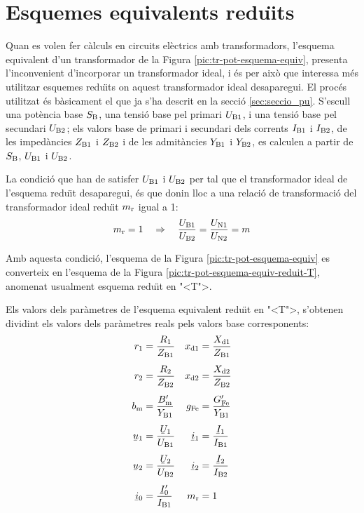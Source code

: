 \section{Esquemes equivalents redu\"{\i}ts}

Quan es volen fer c\`{a}lculs en circuits el\`{e}ctrics amb transformadors, l'esquema equivalent d'un transformador de la Figura  \vref{pic:tr-pot-esquema-equiv}, presenta l'inconvenient d'incorporar un transformador ideal, i \'{e}s per aix\`{o} que interessa m\'{e}s utilitzar esquemes redu\"{\i}ts on aquest transformador ideal desaparegui.
El proc\'{e}s utilitzat \'{e}s b\`{a}sicament el que ja s'ha descrit en la secci\'{o} \vref{sec:seccio_pu}. S'escull una pot\`{e}ncia base $S_\mathrm{B}$, una tensi\'{o} base pel primari $U_\mathrm{B1}$, i una tensi\'{o} base pel secundari $U_\mathrm{B2}$; els valors base de primari i secundari dels corrents $I_\mathrm{B1}$ i $I_\mathrm{B2}$, de les imped\`{a}ncies $Z_\mathrm{B1}$ i $Z_\mathrm{B2}$ i de les admit\`{a}ncies $Y_\mathrm{B1}$ i $Y_\mathrm{B2}$, es calculen a partir de $S_\mathrm{B}$, $U_\mathrm{B1}$ i $U_\mathrm{B2}$.

La condici\'{o} que han de satisfer $U_\mathrm{B1}$ i $U_\mathrm{B2}$ per tal que el transformador ideal de l'esquema redu\"{\i}t desaparegui, \'{e}s que donin lloc a una relaci\'{o} de transformaci\'{o} del transformador ideal redu\"{\i}t $m_\mathrm{r}$ igual a  1:
\begin{equation}\label{eq:mr}
    m_\mathrm{r} = 1 \quad \Rightarrow \quad \frac{U_\mathrm{B1}}{U_\mathrm{B2}} = \frac{U_\mathrm{N1}}{U_\mathrm{N2}} = m
\end{equation}

 Amb aquesta condici\'{o}, l'esquema de la Figura \vref{pic:tr-pot-esquema-equiv} es converteix en l'esquema de la Figura
\vref{pic:tr-pot-esquema-equiv-reduit-T}, anomenat usualment esquema redu\"{\i}t en {"<}T{">}.

\begin{center}
    
    \label{pic:tr-pot-esquema-equiv-reduit-T}
\end{center}

Els valors dels par\`{a}metres de l'esquema equivalent redu\"{\i}t en {"<}T{">}, s'obtenen dividint els valors dels par\`{a}metres reals pels valors base corresponents:
\begin{align}
    r\ped{1} &=\frac{R\ped{1}}{Z\ped{B1}} &   x\ped{d1} &=\frac{X\ped{d1}}{Z\ped{B1}} \\[1ex]
    r\ped{2} &=\frac{R\ped{2}}{Z\ped{B2}} &   x\ped{d2} &=\frac{X\ped{d2}}{Z\ped{B2}} \\[1ex]
    b\ped{m} &=\frac{B\ped{m}'}{Y\ped{B1}}  &   g\ped{Fe} &=\frac{G\ped{Fe}'}{Y\ped{B1}} \\[1ex]
    \cmplx{u}_1 &=\frac{\cmplx{U}_1}{U\ped{B1}} &   \cmplx{i}_1 &=\frac{\cmplx{I}_1}{I\ped{B1}} \\[1ex]
    \cmplx{u}_2 &=\frac{\cmplx{U}_2}{U\ped{B2}} &   \cmplx{i}_2 &=\frac{\cmplx{I}_2}{I\ped{B2}} \\[1ex]
    \cmplx{i}_0 &=\frac{\cmplx{I}_0'}{I\ped{B1}} &   m\ped{r} &=1
\end{align}

